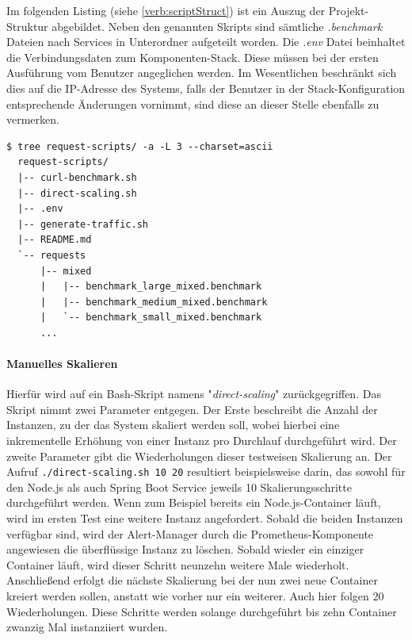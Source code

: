 Im folgenden Listing (siehe \ref{verb:scriptStruct}) ist ein Auszug der Projekt-Struktur abgebildet. Neben den genannten Skripts sind sämtliche \emph{.benchmark} Dateien nach Services in Unterordner aufgeteilt worden. Die \emph{.env} Datei beinhaltet die Verbindungsdaten zum Komponenten-Stack. Diese müssen bei der ersten Ausführung vom Benutzer angeglichen werden. Im Wesentlichen beschränkt sich dies auf die IP-Adresse des Systems, falls der Benutzer in der Stack-Konfiguration entsprechende Änderungen vornimmt, sind diese an dieser Stelle ebenfalls zu vermerken.

\label{verb:scriptStruct}
\begin{minipage}{\linewidth}
\begin{lstlisting}[caption={Bash Skript - Struktur},style=bashStyle]
  $ tree request-scripts/ -a -L 3 --charset=ascii
  request-scripts/
  |-- curl-benchmark.sh
  |-- direct-scaling.sh
  |-- .env
  |-- generate-traffic.sh
  |-- README.md
  `-- requests
      |-- mixed
      |   |-- benchmark_large_mixed.benchmark
      |   |-- benchmark_medium_mixed.benchmark
      |   `-- benchmark_small_mixed.benchmark
      ...
\end{lstlisting}
\end{minipage}

\label{erklaerungDirScal}
\paragraph{Manuelles Skalieren \checkmark}
Hierfür wird auf ein Bash-Skript namens "\emph{direct-scaling}" zurückgegriffen. Das Skript nimmt zwei Parameter entgegen. Der Erste beschreibt die Anzahl der Instanzen, zu der das System skaliert werden soll, wobei hierbei eine inkrementelle Erhöhung von einer Instanz pro Durchlauf durchgeführt wird. Der zweite Parameter gibt die Wiederholungen dieser testweisen Skalierung an. Der Aufruf \verb+./direct-scaling.sh 10 20+ resultiert beispielsweise darin, das sowohl für den Node.js als auch Spring Boot Service jeweils 10 Skalierungsschritte durchgeführt werden. Wenn zum Beispiel bereits ein Node.js-Container läuft, wird im ersten Test eine weitere Instanz angefordert. Sobald die beiden Instanzen verfügbar sind, wird der Alert-Manager durch die Prometheus-Komponente angewiesen die überflüssige Instanz zu löschen. Sobald wieder ein einziger Container läuft, wird dieser Schritt neunzehn weitere Male wiederholt. Anschließend erfolgt die nächste Skalierung bei der nun zwei neue Container kreiert werden sollen, anstatt wie vorher nur ein weiterer. Auch hier folgen 20 Wiederholungen. Diese Schritte werden solange durchgeführt bis zehn Container zwanzig Mal instanziiert wurden.

